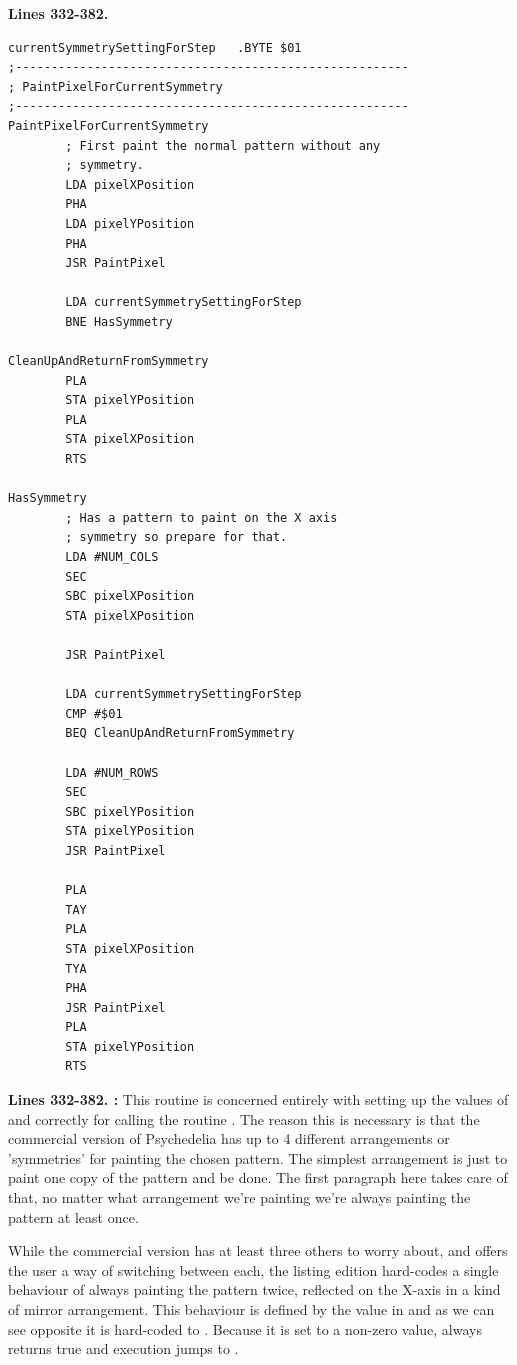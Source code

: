 \clearpage
\textbf{Lines 332-382. }
\begin{lstlisting}[basicstyle=\ttfamily\scriptsize,caption=Choosing what to paint based on the current symmetry setting.]
currentSymmetrySettingForStep   .BYTE $01
;-------------------------------------------------------
; PaintPixelForCurrentSymmetry
;-------------------------------------------------------
PaintPixelForCurrentSymmetry   
        ; First paint the normal pattern without any
        ; symmetry.
        LDA pixelXPosition
        PHA 
        LDA pixelYPosition
        PHA 
        JSR PaintPixel

        LDA currentSymmetrySettingForStep
        BNE HasSymmetry

CleanUpAndReturnFromSymmetry   
        PLA 
        STA pixelYPosition
        PLA 
        STA pixelXPosition
        RTS 

HasSymmetry   
        ; Has a pattern to paint on the X axis
        ; symmetry so prepare for that.
        LDA #NUM_COLS
        SEC 
        SBC pixelXPosition
        STA pixelXPosition

        JSR PaintPixel

        LDA currentSymmetrySettingForStep
        CMP #$01
        BEQ CleanUpAndReturnFromSymmetry

        LDA #NUM_ROWS
        SEC 
        SBC pixelYPosition
        STA pixelYPosition
        JSR PaintPixel

        PLA 
        TAY 
        PLA 
        STA pixelXPosition
        TYA 
        PHA 
        JSR PaintPixel
        PLA 
        STA pixelYPosition
        RTS 

\end{lstlisting}
\clearpage

\textbf{Lines 332-382. :} This routine is concerned entirely with setting up the values of  and  correctly
for calling the routine . The reason this is necessary is that the commercial version of Psychedelia
has up to 4 different arrangements or 'symmetries' for painting the chosen pattern. The simplest arrangement is just to 
paint one copy of the pattern and be done. The first paragraph here takes care of that, no matter what arrangement we're
painting we're always painting the pattern at least once. 

While the commercial version has at least three others to worry about, and offers the user a way of switching between each,
the listing edition hard-codes a single behaviour of always painting the pattern twice, reflected on the X-axis in a kind of mirror
arrangement. This behaviour is defined by the value in  and as we can see opposite it
is hard-coded to . Because it is set to a non-zero value,  always returns true and execution
jumps to .

